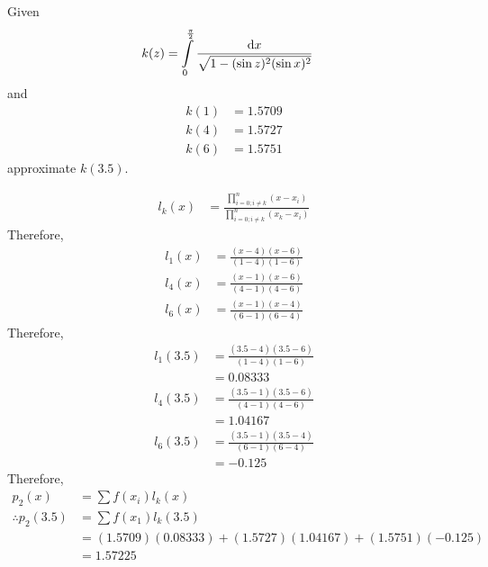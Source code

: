 \documentclass[fleqn, a4paper, 12pt, twoside]{article}
\theoremstyle{definition}
\theoremstyle{theorem}
\begin{document}
\begin{question}
	Given
	\begin{align*}
		k(z) & = \int\limits_{0}^{\frac{\pi}{2}} \frac{\dif x}{\sqrt{1 - (\sin z)^2 (\sin x)^2}}
	\end{align*}
	and
	\begin{align*}
		k(1) & = 1.5709 \\
		k(4) & = 1.5727 \\
		k(6) & = 1.5751
	\end{align*}
	approximate $k(3.5)$.
\end{question}

\begin{solution}
	\begin{align*}
		l_k(x) & = \frac{\prod\limits_{i = 0 ; i \neq k}^{n} (x - x_i)}{\prod\limits_{i = 0 ; i \neq k}^{n} (x_k - x_i)}
	\end{align*}
	Therefore,
	\begin{align*}
		l_1(x) & = \frac{(x - 4) (x - 6)}{(1 - 4) (1 - 6)} \\
		l_4(x) & = \frac{(x - 1) (x - 6)}{(4 - 1) (4 - 6)} \\
		l_6(x) & = \frac{(x - 1) (x - 4)}{(6 - 1) (6 - 4)}
	\end{align*}
	Therefore,
	\begin{align*}
		l_1(3.5) & = \frac{(3.5 - 4) (3.5 - 6)}{(1 - 4) (1 - 6)} \\
                         & = 0.08333                                     \\
		l_4(3.5) & = \frac{(3.5 - 1) (3.5 - 6)}{(4 - 1) (4 - 6)} \\
                         & = 1.04167                                     \\
		l_6(3.5) & = \frac{(3.5 - 1) (3.5 - 4)}{(6 - 1) (6 - 4)} \\
                         & = -0.125
	\end{align*}
	Therefore,
	\begin{align*}
		p_2(x)              & = \sum f(x_i) l_k(x)                                          \\
		\therefore p_2(3.5) & = \sum f(x_1) l_k(3.5)                                        \\
                                    & = (1.5709) (0.08333) + (1.5727) (1.04167) + (1.5751) (-0.125) \\
                                    & = 1.57225
	\end{align*}
\end{solution}
\end{document}
